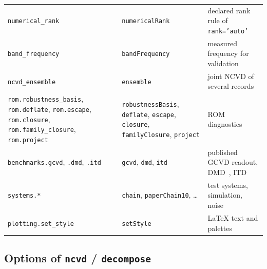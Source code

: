 \documentclass[report]{nld}
\theoremstyle{remark}\newtheorem*{remark}{Remark}
\newcommand{\code}[1]{\texttt{#1}}
\begin{document}
\begin{center}
\begin{longtable}{@{}>{\raggedright}p{4.6cm}>{\raggedright}p{4.4cm}>{\raggedright\arraybackslash}p{6.2cm}@{}}
\code{numerical\_rank} & \code{numericalRank} & declared rank rule of \code{rank='auto'}\\
\code{band\_frequency} & \code{bandFrequency} & measured frequency for validation\\
\code{ncvd\_ensemble} & \code{ensemble} & joint NCVD of several records\\
\code{rom.robustness\_basis}, \code{rom.deflate}, \code{rom.escape}, \code{rom.closure}, \code{rom.family\_closure}, \code{rom.project} & \code{robustnessBasis}, \code{deflate}, \code{escape}, \code{closure}, \code{familyClosure}, \code{project} & ROM diagnostics\\
\code{benchmarks.gcvd}, \code{.dmd}, \code{.itd} & \code{gcvd}, \code{dmd}, \code{itd} & published GCVD readout, DMD~\cite{schmid2010}, ITD~\cite{ibrahim1982}\\
\code{systems.*} & \code{chain}, \code{paperChain10}, \dots & test systems, simulation, noise\\
\code{plotting.set\_style} & \code{setStyle} & LaTeX text and palettes\\
\bottomrule
\end{longtable}
\end{center}

\subsection{Options of \code{ncvd} / \code{decompose}}
\end{document}

